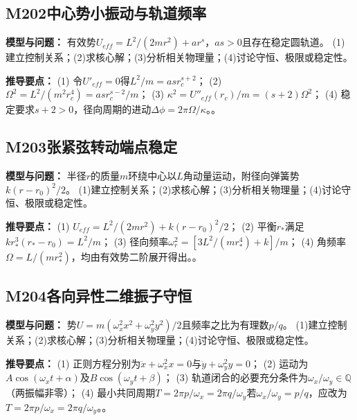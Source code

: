 

\subsection*{M202\quad 中心势小振动与轨道频率}

\textbf{模型与问题：} 有效势$U_{eff}=L^2/(2mr^2)+ar^s$，$a s>0$且存在稳定圆轨道。 (1)建立控制关系；(2)求核心解；(3)分析相关物理量；(4)讨论守恒、极限或稳定性。

\par\textbf{推导要点：} (1) 令$U'_{eff}=0$得$L^2/m=asr_c^{s+2}$； (2) $\Omega^2=L^2/(m^2r_c^4)=asr_c^{s-2}/m$； (3) $\kappa^2=U''_{eff}(r_c)/m=(s+2)\Omega^2$； (4) 稳定要求$s+2>0$，径向周期的进动$\Delta\phi=2\pi\Omega/\kappa$。。

\par\medskip

\subsection*{M203\quad 张紧弦转动端点稳定}

\textbf{模型与问题：} 半径$r$的质量$m$环绕中心以$L$角动量运动，附径向弹簧势$k(r-r_0)^2/2$。 (1)建立控制关系；(2)求核心解；(3)分析相关物理量；(4)讨论守恒、极限或稳定性。

\par\textbf{推导要点：} (1) $U_{eff}=L^2/(2mr^2)+k(r-r_0)^2/2$； (2) 平衡$r_*$满足$kr_*^3(r_*-r_0)=L^2/m$； (3) 径向频率$\omega_r^2=[3L^2/(mr_*^4)+k]/m$； (4) 角频率$\Omega=L/(mr_*^2)$，均由有效势二阶展开得出。。

\par\medskip

\subsection*{M204\quad 各向异性二维振子守恒}

\textbf{模型与问题：} 势$U=m(\omega_x^2x^2+\omega_y^2y^2)/2$且频率之比为有理数$p/q$。 (1)建立控制关系；(2)求核心解；(3)分析相关物理量；(4)讨论守恒、极限或稳定性。

\par\textbf{推导要点：} (1) 正则方程分别为$\ddot x+\omega_x^2x=0$与$\ddot y+\omega_y^2y=0$； (2) 运动为$A\cos(\omega_xt+\alpha)$及$B\cos(\omega_yt+\beta)$； (3) 轨道闭合的必要充分条件为$\omega_x/\omega_y\in\mathbb Q$（两振幅非零）； (4) 最小共同周期$T=2\pi p/\omega_x=2\pi q/\omega_y$若$\omega_x/\omega_y=p/q$，应改为$T=2\pi p/\omega_x=2\pi q/\omega_y$。。

